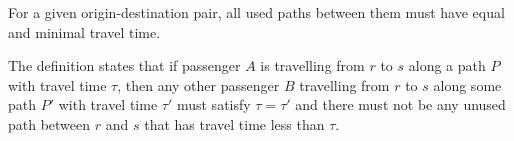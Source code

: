 \begin{definition}
For a given origin-destination pair, all used paths between
them must have equal and minimal travel time.
\end{definition}

The definition states that if passenger $A$ is travelling from
$r$ to $s$ along a path $P$ with travel time $\tau$, then any
other passenger $B$ travelling from $r$ to $s$ along some path $P'$
with travel time $\tau'$ must satisfy $\tau=\tau'$ and there must
not be any unused path between $r$ and $s$ that has travel time less
than $\tau$.
